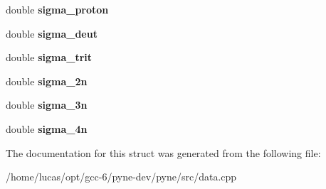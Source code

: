 \begin{DoxyCompactItemize}
\item 
double {\bfseries sigma\+\_\+proton}\hypertarget{structsimple__xs_aff5767a5644512bc20acdb7b6be11f6a}{}\label{structsimple__xs_aff5767a5644512bc20acdb7b6be11f6a}

\item 
double {\bfseries sigma\+\_\+deut}\hypertarget{structsimple__xs_a144a201fa75999fe72b1e7ff6cf599de}{}\label{structsimple__xs_a144a201fa75999fe72b1e7ff6cf599de}

\item 
double {\bfseries sigma\+\_\+trit}\hypertarget{structsimple__xs_ac94cd1b3c4d07c830484563268c9e3b4}{}\label{structsimple__xs_ac94cd1b3c4d07c830484563268c9e3b4}

\item 
double {\bfseries sigma\+\_\+2n}\hypertarget{structsimple__xs_a48428459c08bd8e7ca73ede3d5d1b12d}{}\label{structsimple__xs_a48428459c08bd8e7ca73ede3d5d1b12d}

\item 
double {\bfseries sigma\+\_\+3n}\hypertarget{structsimple__xs_a2d20b02fe8098c55466d12de065bfdee}{}\label{structsimple__xs_a2d20b02fe8098c55466d12de065bfdee}

\item 
double {\bfseries sigma\+\_\+4n}\hypertarget{structsimple__xs_a1c2a32a82a8f3e381d67b778c89c499e}{}\label{structsimple__xs_a1c2a32a82a8f3e381d67b778c89c499e}

\end{DoxyCompactItemize}


The documentation for this struct was generated from the following file\+:\begin{DoxyCompactItemize}
\item 
/home/lucas/opt/gcc-\/6/pyne-\/dev/pyne/src/data.\+cpp\end{DoxyCompactItemize}
